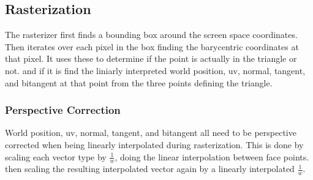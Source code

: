 \documentclass[12pt]{article}
\begin{document}
\subsection{Rasterization}
The rasterizer first finds a bounding box around the screen space coordinates. Then iterates over each pixel in the box finding the barycentric coordinates at that pixel. It uses these to determine if the point is actually in the triangle or not. and if it is find the liniarly interpreted world position, uv, normal, tangent, and bitangent at that point from the three points defining the triangle.

\subsubsection{Perspective Correction}
World position, uv, normal, tangent, and bitangent all need to be perspective corrected when being linearly interpolated during rasterization. This is done by scaling each vector type by $\frac1w$, doing the linear interpolation between face points. then scaling the resulting interpolated vector again by a linearly interpolated $\frac1w$.
\end{document}
